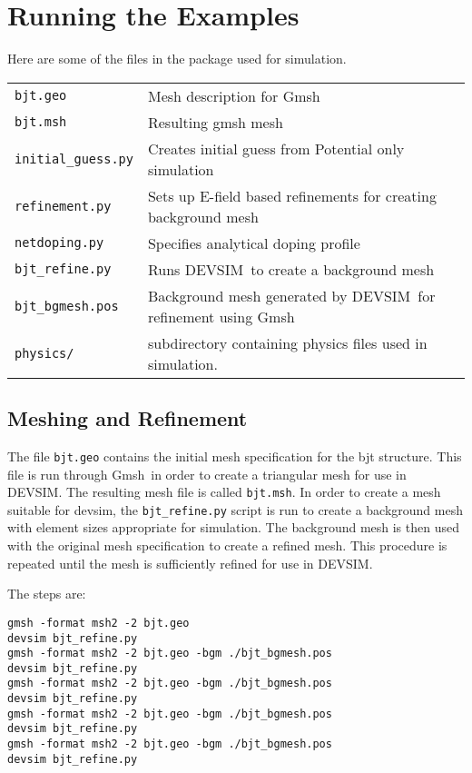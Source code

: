 \documentclass[11pt]{article}
\newcommand{\devsim}{\mbox{DEVSIM}}
\newcommand{\gmsh}{\mbox{Gmsh}}
\begin{document}
\section{Running the Examples}
\begin{minipage}{\textwidth}
Here are some of the files in the package used for simulation.

\begin{tabular}{ll}
\texttt{bjt.geo} & Mesh description for \gmsh\\
\texttt{bjt.msh} & Resulting gmsh mesh\\
\texttt{initial\_guess.py}  & Creates initial guess from Potential only simulation\\
\texttt{refinement.py}  & Sets up E-field based refinements for creating background mesh\\
\texttt{netdoping.py}  & Specifies analytical doping profile\\
\texttt{bjt\_refine.py} & Runs \devsim\ to create a background mesh\\
\texttt{bjt\_bgmesh.pos} & Background mesh generated by \devsim\ for refinement using \gmsh\\
\texttt{physics/} & subdirectory containing physics files used in simulation.
\end{tabular}
\end{minipage}

\subsection{Meshing and Refinement}

The file \texttt{bjt.geo} contains the initial mesh specification for the bjt structure.  This file is run through \gmsh\ in order to create a triangular mesh for use in \devsim.  The resulting mesh file is called \texttt{bjt.msh}.  In order to create a mesh suitable for devsim, the \texttt{bjt\_refine.py} script is run to create a background mesh with element sizes appropriate for simulation.  The background mesh is then used with the original mesh specification to create a refined mesh.  This procedure is repeated until the mesh is sufficiently refined for use in \devsim.

\begin{minipage}{\textwidth}
The steps are:
\begin{verbatim}
gmsh -format msh2 -2 bjt.geo
devsim bjt_refine.py
gmsh -format msh2 -2 bjt.geo -bgm ./bjt_bgmesh.pos
devsim bjt_refine.py
gmsh -format msh2 -2 bjt.geo -bgm ./bjt_bgmesh.pos
devsim bjt_refine.py
gmsh -format msh2 -2 bjt.geo -bgm ./bjt_bgmesh.pos
devsim bjt_refine.py
gmsh -format msh2 -2 bjt.geo -bgm ./bjt_bgmesh.pos
devsim bjt_refine.py
\end{verbatim}
\end{minipage}
\\~\\
\end{document}
